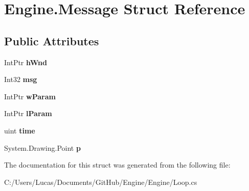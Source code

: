 \hypertarget{struct_engine_1_1_message}{\section{Engine.\-Message Struct Reference}
\label{struct_engine_1_1_message}
}
\subsection*{Public Attributes}
\begin{DoxyCompactItemize}
\item 
\hypertarget{struct_engine_1_1_message_a9097ace8f48a7d902a0a4405b7e7f9a4}{Int\-Ptr {\bfseries h\-Wnd}}\label{struct_engine_1_1_message_a9097ace8f48a7d902a0a4405b7e7f9a4}

\item 
\hypertarget{struct_engine_1_1_message_a2aa50d627b5804b57f60fe0652af7b66}{Int32 {\bfseries msg}}\label{struct_engine_1_1_message_a2aa50d627b5804b57f60fe0652af7b66}

\item 
\hypertarget{struct_engine_1_1_message_aa396d20c90f5cb04be92c743c2e926c3}{Int\-Ptr {\bfseries w\-Param}}\label{struct_engine_1_1_message_aa396d20c90f5cb04be92c743c2e926c3}

\item 
\hypertarget{struct_engine_1_1_message_a51d09cb3ba7b46bcfe2530acf505ebf1}{Int\-Ptr {\bfseries l\-Param}}\label{struct_engine_1_1_message_a51d09cb3ba7b46bcfe2530acf505ebf1}

\item 
\hypertarget{struct_engine_1_1_message_a804cd0d530af595bb48ad843cec23bcd}{uint {\bfseries time}}\label{struct_engine_1_1_message_a804cd0d530af595bb48ad843cec23bcd}

\item 
\hypertarget{struct_engine_1_1_message_ad1984444f5cb726adab454b95dd6e424}{System.\-Drawing.\-Point {\bfseries p}}\label{struct_engine_1_1_message_ad1984444f5cb726adab454b95dd6e424}

\end{DoxyCompactItemize}


The documentation for this struct was generated from the following file\-:\begin{DoxyCompactItemize}
\item 
C\-:/\-Users/\-Lucas/\-Documents/\-Git\-Hub/\-Engine/\-Engine/Loop.\-cs\end{DoxyCompactItemize}
